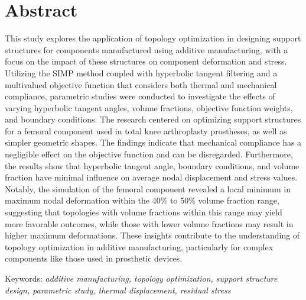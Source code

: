 \documentclass[../main.tex]{subfiles}
\begin{document}
\chapter*{Abstract}

 This study explores the application of topology optimization in designing support structures for components manufactured using additive manufacturing, with a focus on the impact of these structures on component deformation and stress. Utilizing the SIMP method coupled with hyperbolic tangent filtering and a multivalued objective function that considers both thermal and mechanical compliance, parametric studies were conducted to investigate the effects of varying hyperbolic tangent angles, volume fractions, objective function weights, and boundary conditions. The research centered on optimizing support structures for a femoral component used in total knee arthroplasty prostheses, as well as simpler geometric shapes. The findings indicate that mechanical compliance has a negligible effect on the objective function and can be disregarded. Furthermore, the results show that hyperbolic tangent angle, boundary conditions, and volume fraction have minimal influence on average nodal displacement and stress values. Notably, the simulation of the femoral component revealed a local minimum in maximum nodal deformation within the 40\% to 50\% volume fraction range, suggesting that topologies with volume fractions within this range may yield more favorable outcomes, while those with lower volume fractions may result in higher maximum deformations. These insights contribute to the understanding of topology optimization in additive manufacturing, particularly for complex components like those used in prosthetic devices.

Keywords: \textit{additive manufacturing, topology optimization, support structure design, parametric study, thermal displacement, residual stress}
\end{document}

